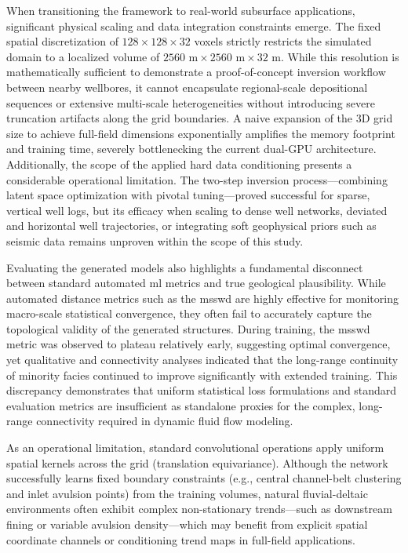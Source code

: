 When transitioning the framework to real-world subsurface applications, significant physical scaling and data integration constraints emerge. The fixed spatial discretization of $128 \times 128 \times 32$ voxels strictly restricts the simulated domain to a localized volume of $2560\text{ m} \times 2560\text{ m} \times 32\text{ m}$. While this resolution is mathematically sufficient to demonstrate a proof-of-concept inversion workflow between nearby wellbores, it cannot encapsulate regional-scale depositional sequences or extensive multi-scale heterogeneities without introducing severe truncation artifacts along the grid boundaries. A naive expansion of the 3D grid size to achieve full-field dimensions exponentially amplifies the memory footprint and training time, severely bottlenecking the current dual-GPU architecture. Additionally, the scope of the applied hard data conditioning presents a considerable operational limitation. The two-step inversion process—combining latent space optimization with pivotal tuning—proved successful for sparse, vertical well logs, but its efficacy when scaling to dense well networks, deviated and horizontal well trajectories, or integrating soft geophysical priors such as seismic data remains unproven within the scope of this study.

Evaluating the generated models also highlights a fundamental disconnect between standard automated \gls{ml} metrics and true geological plausibility. While automated distance metrics such as the \gls{msswd} are highly effective for monitoring macro-scale statistical convergence, they often fail to accurately capture the topological validity of the generated structures. During training, the \gls{msswd} metric was observed to plateau relatively early, suggesting optimal convergence, yet qualitative and connectivity analyses indicated that the long-range continuity of minority facies continued to improve significantly with extended training. This discrepancy demonstrates that uniform statistical loss formulations and standard evaluation metrics are insufficient as standalone proxies for the complex, long-range connectivity required in dynamic fluid flow modeling.

As an operational limitation, standard convolutional operations apply uniform spatial kernels across the grid (translation equivariance). Although the network successfully learns fixed boundary constraints (e.g., central channel-belt clustering and inlet avulsion points) from the training volumes, natural fluvial-deltaic environments often exhibit complex non-stationary trends—such as downstream fining or variable avulsion density—which may benefit from explicit spatial coordinate channels or conditioning trend maps in full-field applications.


